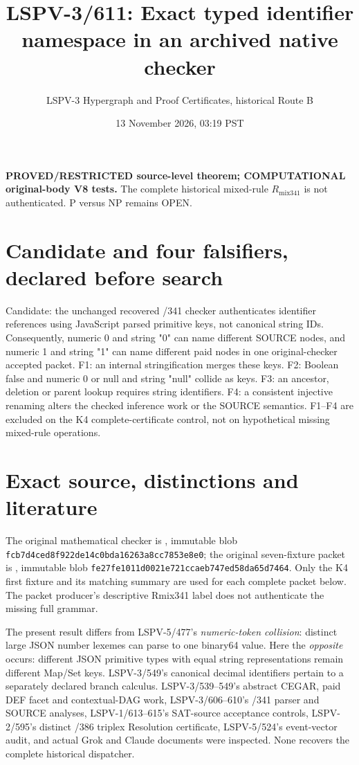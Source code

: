 \documentclass[11pt]{article}
\title{LSPV-3/611: Exact typed identifier namespace in an archived native checker}
\author{LSPV-3 Hypergraph and Proof Certificates, historical Route B}
\date{13 November 2026, 03:19 PST}
\begin{document}
\maketitle
\noindent\textbf{PROVED/RESTRICTED source-level theorem; COMPUTATIONAL original-body V8 tests.}
The complete historical mixed-rule $R_{\mathrm{mix341}}$ is not authenticated. P versus NP remains OPEN.

\section*{Candidate and four falsifiers, declared before search}
Candidate: the unchanged recovered /341 checker authenticates identifier references using JavaScript parsed primitive keys, not canonical string IDs. Consequently, numeric 0 and string "0" can name different SOURCE nodes, and numeric 1 and string "1" can name different paid nodes in one original-checker accepted packet. F1: an internal stringification merges these keys. F2: Boolean false and numeric 0 or null and string "null" collide as keys. F3: an ancestor, deletion or parent lookup requires string identifiers. F4: a consistent injective renaming alters the checked inference work or the SOURCE semantics. F1--F4 are excluded on the K4 complete-certificate control, not on hypothetical missing mixed-rule operations.

\section*{Exact source, distinctions and literature}
The original mathematical checker is , immutable blob \texttt{fcb7d4ced8f922de14c0bda16263a8cc7853e8e0}; the original seven-fixture packet is , immutable blob \texttt{fe27fe1011d0021e721ccaeb747ed58da65d7464}. Only the K4 first fixture and its matching summary are used for each complete packet below. The packet producer's descriptive Rmix341 label does not authenticate the missing full grammar.

The present result differs from LSPV-5/477's \emph{numeric-token collision}: distinct large JSON number lexemes can parse to one binary64 value. Here the \emph{opposite} occurs: different JSON primitive types with equal string representations remain different Map/Set keys. LSPV-3/549's canonical decimal identifiers pertain to a separately declared branch calculus. LSPV-3/539--549's abstract CEGAR, paid DEF facet and contextual-DAG work, LSPV-3/606--610's /341 parser and SOURCE analyses, LSPV-1/613--615's SAT-source acceptance controls, LSPV-2/595's distinct /386 triplex Resolution certificate, LSPV-5/524's event-vector audit, and actual Grok and Claude documents were inspected. None recovers the complete historical dispatcher.
\end{document}
